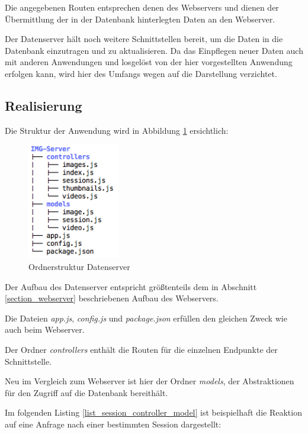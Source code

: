 Die angegebenen Routen entsprechen denen des Webservers und dienen der Übermittlung 
der in der Datenbank hinterlegten Daten an den Webserver.

Der Datenserver hält noch weitere Schnittstellen bereit, um die Daten in die Datenbank einzutragen
und zu aktualisieren. Da das Einpflegen neuer Daten auch mit anderen Anwendungen und losgelöst
von der hier vorgestellten Anwendung erfolgen kann, wird hier des Umfangs wegen auf die Darstellung verzichtet.

\subsection{Realisierung}
Die Struktur der Anwendung wird in Abbildung \ref{fig_struktur_datenserver} ersichtlich:

\begin{figure}[h]
	\centering
	\includegraphics[width=4cm]{bilder/ordnerstruktur_datenserver}
	\caption{Ordnerstruktur Datenserver}
	\label{fig_struktur_datenserver}
\end{figure}

Der Aufbau des Datenserver entspricht größtenteils dem in Abschnitt \ref{section_webserver} beschriebenen Aufbau des Webservers.

Die Dateien \textit{app.js}, \textit{config.js} und \textit{package.json} erfüllen 
den gleichen Zweck wie auch beim Webserver.

Der Ordner \textit{controllers} enthält die Routen für die einzelnen Endpunkte der Schnittstelle.

Neu im Vergleich zum Webserver ist hier der Ordner \textit{models}, der Abstraktionen 
für den Zugriff auf die Datenbank bereithält.\clearpage

Im folgenden Listing \ref{list_session_controller_model} ist beispielhaft die Reaktion 
auf eine Anfrage nach einer bestimmten Session dargestellt:

